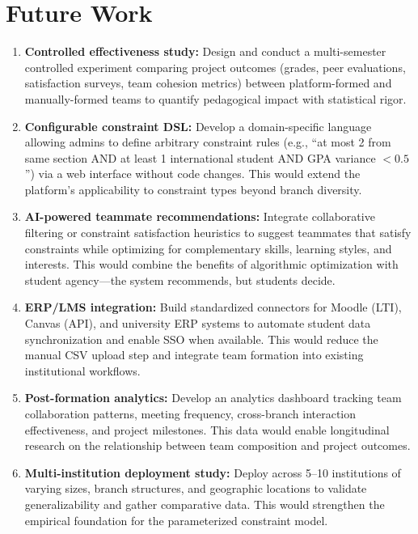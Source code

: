 \documentclass[conference]{IEEEtran}
\begin{document}
\section{Future Work}
\label{sec:future}

\begin{enumerate}[noitemsep,topsep=3pt]
    \item \textbf{Controlled effectiveness study:} Design and conduct a multi-semester controlled experiment comparing project outcomes (grades, peer evaluations, satisfaction surveys, team cohesion metrics) between platform-formed and manually-formed teams to quantify pedagogical impact with statistical rigor.

    \item \textbf{Configurable constraint DSL:} Develop a domain-specific language allowing admins to define arbitrary constraint rules (e.g., ``at most 2 from same section AND at least 1 international student AND GPA variance $< 0.5$'') via a web interface without code changes. This would extend the platform's applicability to constraint types beyond branch diversity.

    \item \textbf{AI-powered teammate recommendations:} Integrate collaborative filtering or constraint satisfaction heuristics to suggest teammates that satisfy constraints while optimizing for complementary skills, learning styles, and interests. This would combine the benefits of algorithmic optimization with student agency---the system recommends, but students decide.

    \item \textbf{ERP/LMS integration:} Build standardized connectors for Moodle (LTI), Canvas (API), and university ERP systems to automate student data synchronization and enable SSO when available. This would reduce the manual CSV upload step and integrate team formation into existing institutional workflows.

    \item \textbf{Post-formation analytics:} Develop an analytics dashboard tracking team collaboration patterns, meeting frequency, cross-branch interaction effectiveness, and project milestones. This data would enable longitudinal research on the relationship between team composition and project outcomes.

    \item \textbf{Multi-institution deployment study:} Deploy across 5--10 institutions of varying sizes, branch structures, and geographic locations to validate generalizability and gather comparative data. This would strengthen the empirical foundation for the parameterized constraint model.


\end{enumerate}
\end{document}
